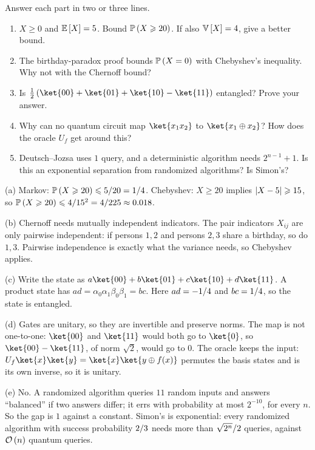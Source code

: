 \begin{question}
    Answer each part in two or three lines.
    \begin{enumerate}[label=(\alph*)]
        \item $X \geq 0$ and $\operatorname{\mathbb{E}}\left[X\right] = 5$. Bound $\operatorname{\mathbb{P}}\left(X \geqslant 20\right)$. If also
              $\operatorname{\mathbb{V}}\left[X\right] = 4$, give a better bound.
        \item The birthday-paradox proof bounds $\operatorname{\mathbb{P}}\left(X = 0\right)$ with Chebyshev's inequality. Why not
              with the Chernoff bound?
        \item Is $\frac{1}{2}\left(\ket{00} + \ket{01} + \ket{10} - \ket{11}\right)$ entangled?
              Prove your answer.
        \item Why can no quantum circuit map $\ket{x_1 x_2}$ to $\ket{x_1 \oplus x_2}$? How does the
              oracle $U_f$ get around this?
        \item Deutsch--Jozsa uses $1$ query, and a deterministic algorithm needs $2^{n-1} + 1$. Is
              this an exponential separation from randomized algorithms? Is Simon's?
    \end{enumerate}
\end{question}
\begin{msolution}
    (a) Markov: $\operatorname{\mathbb{P}}\left(X \geqslant 20\right) \leqslant 5/20 = 1/4$. Chebyshev: $X \geq 20$
    implies $\left\lvert X - 5\right\rvert \geqslant 15$, so $\operatorname{\mathbb{P}}\left(X \geqslant 20\right) \leqslant 4/15^2 = 4/225
    \approx 0.018$.

    (b) Chernoff needs mutually independent indicators. The pair indicators $X_{ij}$ are only
    pairwise independent: if persons $1, 2$ and persons $2, 3$ share a birthday, so do $1, 3$.
    Pairwise independence is exactly what the variance needs, so Chebyshev applies.

    (c) Write the state as $a\ket{00} + b\ket{01} + c\ket{10} + d\ket{11}$. A product state has
    $ad = \alpha_0\alpha_1\beta_0\beta_1 = bc$. Here $ad = -1/4$ and $bc = 1/4$,
    so the state is entangled.

    (d) Gates are unitary, so they are invertible and preserve norms. The map is not one-to-one:
    $\ket{00}$ and $\ket{11}$ would both go to $\ket{0}$, so $\ket{00} - \ket{11}$, of norm
    $\sqrt{2}$, would go to $0$. The oracle keeps the input:
    $U_f\ket{x}\ket{y} = \ket{x}\ket{y \oplus f(x)}$ permutes the basis states and is its own
    inverse, so it is unitary.

    (e) No. A randomized algorithm queries $11$ random inputs and answers ``balanced'' if two
    answers differ; it errs with probability at most $2^{-10}$, for every $n$. So the gap is
    $1$ against a constant. Simon's is exponential: every randomized algorithm with success
    probability $2/3$ needs more than $\sqrt{2^n}/2$ queries, against $\mathcal{O}\left(n\right)$
    quantum queries.
\end{msolution}

